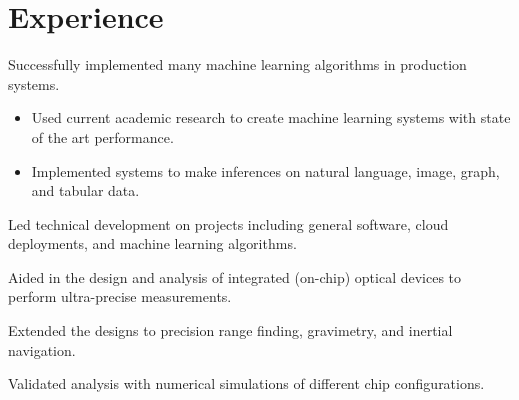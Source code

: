 \documentclass[]{deedy-resume-openfont}
\begin{document}
\hfill
\begin{minipage}[t]{0.66\textwidth} 


\section{Experience}
\vspace{\topsep}
\begin{tightemize}
\item Successfully implemented many machine learning algorithms in production systems.
	\begin{itemize}
	\item Used current academic research to create machine learning systems with state of the art performance.
	\item Implemented systems to make inferences on natural language, image, graph, and tabular data.
	\end{itemize}
\item Led technical development on projects including general software, cloud deployments, and machine learning algorithms.
\end{tightemize}
  
\sectionsep
{}
\begin{tightemize}
\item Aided in the design and analysis of integrated (on-chip) optical devices to perform ultra-precise measurements.
\item Extended the designs to precision range finding, gravimetry, and inertial navigation.
\item Validated analysis with numerical simulations of different chip configurations.
\end{tightemize}
\sectionsep


\end{minipage}
\end{document}

